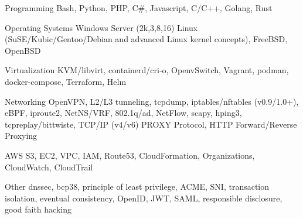 
\begin{cvskills}

\cvskill
{Programming} 
{Bash, Python, PHP, C\#, Javascript, C/C++, Golang, Rust}

\cvskill
{Operating Systems} 
{Windows Server (2k,3,8,16) Linux (SuSE/Kubic/Gentoo/Debian and advanced Linux kernel concepts), FreeBSD, OpenBSD}

\cvskill
{Virtualization}
{KVM/libvirt, containerd/cri-o, OpenvSwitch, Vagrant, podman, docker-compose, Terraform, Helm}

\cvskill
{Networking} 
{OpenVPN, L2/L3 tunneling, tcpdump, iptables/nftables (v0.9/1.0+), eBPF, iproute2, NetNS/VRF, 802.1q/ad, NetFlow, scapy, hping3, tcpreplay/bittwiste, TCP/IP (v4/v6) PROXY Protocol, HTTP Forward/Reverse Proxying} 

\cvskill
{AWS}
{S3, EC2, VPC, IAM, Route53, CloudFormation, Organizations, CloudWatch, CloudTrail}

\cvskill
{Other}
{dnssec, bcp38, principle of least privilege, ACME, SNI, transaction isolation, eventual consistency, OpenID, JWT, SAML, responsible disclosure, good faith hacking}
\end{cvskills}

